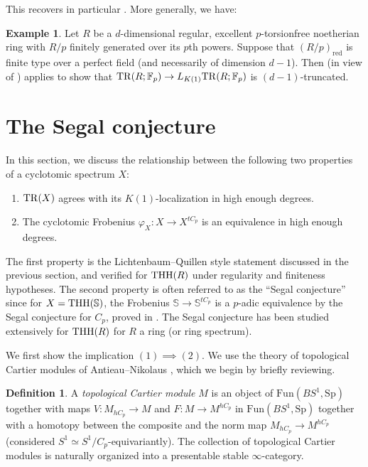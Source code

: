\documentclass{amsart}
\renewcommand{\sp}{\mathrm{Sp}}
\theoremstyle{definition}
\newcommand{\fun}{\mathrm{Fun}}
\newtheorem{definition}[theorem]{Definition}
\newtheorem{example}[theorem]{Example}
\begin{document}
This recovers in particular . 
More generally, we have: 
\begin{example} 
Let $R$ be a $d$-dimensional regular, excellent $p$-torsionfree noetherian ring with $R/p$ finitely generated over its
$p$th powers. 
Suppose that $(R/p)_{\mathrm{red}}$ is 
finite type over a perfect field (and necessarily of dimension $d-1$). 
Then  (in view of ) applies to show that
$\mathrm{TR}(R; \mathbb{F}_p) \to L_{K(1)} \mathrm{TR}(R; \mathbb{F}_p)$ is $(d-1)$-truncated. 
\end{example} 


\section{The Segal conjecture}


In this section, we discuss the relationship between the following two
properties of a cyclotomic spectrum $X$: 
\begin{enumerate}
\item  $\mathrm{TR}(X)$ agrees with its $K(1)$-localization in high enough degrees. 
\item The cyclotomic Frobenius $\varphi_X \colon  X \to X^{tC_p}$ is an equivalence in
high enough degrees. 
\end{enumerate}

The first property is the Lichtenbaum--Quillen style statement discussed in the
previous section, and verified for $\mathrm{THH}(R)$ under regularity and finiteness
hypotheses. 
The second property is often referred to as the ``Segal conjecture'' since for
$X = \mathrm{THH}(\mathbb{S})$, the Frobenius $\mathbb{S} \to \mathbb{S}^{tC_p}$ is a
$p$-adic 
equivalence by the Segal conjecture for $C_p$, proved in \cite{Lin80, Gun80}. 
The Segal conjecture has been studied extensively for $\mathrm{THH}(R)$ for $R$ a ring
(or ring spectrum). 


We first show the implication $(1) \implies (2)$. 
We use the theory of topological Cartier modules of Antieau--Nikolaus \cite{AN},
which we begin by briefly reviewing.

\begin{definition}
A \emph{topological Cartier module} $M$ is an object of $\fun(BS^1, \sp)$ together with
maps $V \colon M_{hC_p} \to M$ and $F \colon M \to M^{hC_p}$ in
$\fun(BS^1, \sp)$ together with a
homotopy between the composite and the norm map $M_{hC_p} \to M^{hC_p}$
(considered $S^1 \simeq S^1/C_p$-equivariantly). 
The collection of topological Cartier modules is naturally organized into a
presentable stable $\infty$-category. 
\end{definition} 
\end{document}
